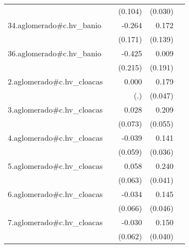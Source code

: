 {\begin{longtable}{l*{4}{D{.}{.}{-1}}}
            &                     &     (0.104)         &     (0.030)         &                     \\
\addlinespace
34.aglomerado#c.hv\_banio&                     &      -0.264         &       0.172         &                     \\
            &                     &     (0.171)         &     (0.139)         &                     \\
\addlinespace
36.aglomerado#c.hv\_banio&                     &      -0.425\sym{*}  &       0.009         &                     \\
            &                     &     (0.215)         &     (0.191)         &                     \\
\addlinespace
2.aglomerado#c.hv\_cloacas&                     &       0.000         &       0.179\sym{***}&                     \\
            &                     &         (.)         &     (0.047)         &                     \\
\addlinespace
3.aglomerado#c.hv\_cloacas&                     &       0.028         &       0.209\sym{***}&                     \\
            &                     &     (0.073)         &     (0.055)         &                     \\
\addlinespace
4.aglomerado#c.hv\_cloacas&                     &      -0.039         &       0.141\sym{***}&                     \\
            &                     &     (0.059)         &     (0.036)         &                     \\
\addlinespace
5.aglomerado#c.hv\_cloacas&                     &       0.058         &       0.240\sym{***}&                     \\
            &                     &     (0.063)         &     (0.041)         &                     \\
\addlinespace
6.aglomerado#c.hv\_cloacas&                     &      -0.034         &       0.145\sym{**} &                     \\
            &                     &     (0.066)         &     (0.046)         &                     \\
\addlinespace
7.aglomerado#c.hv\_cloacas&                     &      -0.030         &       0.150\sym{***}&                     \\
            &                     &     (0.062)         &     (0.040)         &                     \\

\end{longtable}}
